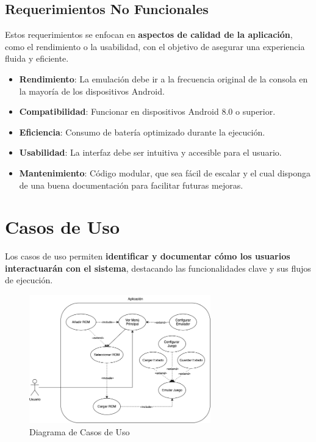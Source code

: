 \subsection{Requerimientos No Funcionales}

Estos requerimientos se enfocan en \textbf{aspectos de calidad de la aplicación}, como el rendimiento o la usabilidad, con el objetivo de asegurar una experiencia fluida y eficiente.

\begin{itemize}
    \item \textbf{Rendimiento}: La emulación debe ir a la frecuencia original de la consola en la mayoría de los dispositivos Android.
    \item \textbf{Compatibilidad}: Funcionar en dispositivos Android 8.0 o superior.
    \item \textbf{Eficiencia}: Consumo de batería optimizado durante la ejecución.
    \item \textbf{Usabilidad}: La interfaz debe ser intuitiva y accesible para el usuario.
    \item \textbf{Mantenimiento}: Código modular, que sea fácil de escalar y el cual disponga de una buena documentación para facilitar futuras mejoras.
\end{itemize}

\section{Casos de Uso}

Los casos de uso permiten \textbf{identificar y documentar cómo los usuarios interactuarán con el sistema}, destacando las funcionalidades clave y sus flujos de ejecución.

\begin{figure}[H]
    \centering
    \includegraphics[width=0.7\textwidth]{include/images/casosuso.png}
    \caption{Diagrama de Casos de Uso}
    \label{figure:usecases}
\end{figure}

